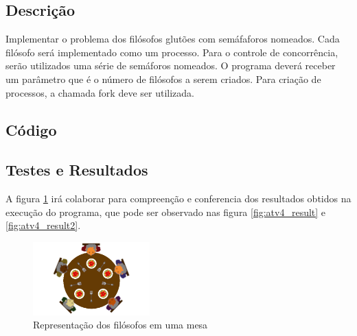 \documentclass{article}
\begin{document}
\subsection{Descrição}
Implementar o problema dos filósofos glutões com semáfaforos nomeados. Cada filósofo será implementado como um processo. Para o controle de concorrência, serão utilizados uma série de semáforos nomeados. O programa deverá receber um parâmetro que é o número de filósofos a serem criados. Para criação de processos, a chamada fork deve ser utilizada.
\subsection{Código}

\subsection{Testes e Resultados}
A figura \ref{fig:figlu} irá colaborar para compreenção e conferencia dos resultados obtidos na execução do programa, que pode ser observado nas figura \ref{fig:atv4_result} e \ref{fig:atv4_result2}.

\begin{figure}[ht]
    \centering
    \includegraphics[width=0.4\textwidth]{./Images/figlu.png}
    \caption{Representação dos filósofos em uma mesa}
    \label{fig:figlu}
\end{figure}
\end{document}
